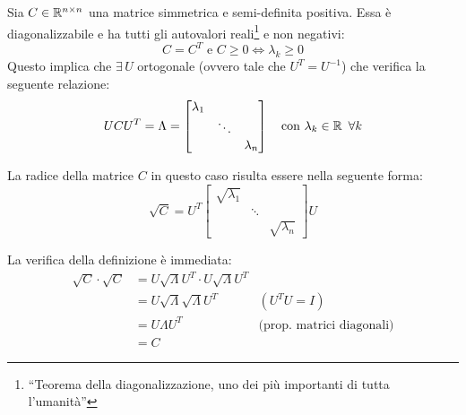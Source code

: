Sia $C \in \mathbb R^{n \times n}$ una matrice simmetrica e semi-definita positiva.
Essa è diagonalizzabile e ha tutti gli autovalori reali\footnote{``Teorema della diagonalizzazione, uno dei più importanti di tutta l'umanità''} e non negativi:
$$C=C^T \text{ e } C \ge 0 \iff \lambda_k \ge 0$$
Questo implica che $\exists \, U$ ortogonale (ovvero tale che $U^T=U^{-1}$) che verifica la seguente relazione:
$$ U C U^T = \Lambda =
\begin{bmatrix}
\lambda_1 \\
\ \ & \ddots & \ \ \\
\ \ & \ \ & \lambda_n
\end{bmatrix} \quad \text{con }\lambda_k \in \mathbb R \enspace \forall k$$

La radice della matrice $C$ in questo caso risulta essere nella seguente forma:
$$\sqrt{C} = U^T \begin{bmatrix}\sqrt{\lambda_1} & &  \\  & \ddots &  \\  &  & \sqrt{\lambda_n} \end{bmatrix} U $$

La verifica della definizione è immediata:
\begin{align*}
	\sqrt{C} \cdot \sqrt{C} &= U \sqrt{\Lambda} U^T \cdot U \sqrt{\Lambda} U^T &\\
	&= U \sqrt{\Lambda} \sqrt{\Lambda} U^T & (U^T U = I) \\
	&= U \Lambda U^T &\text{(prop. matrici diagonali)} \\
	&= C
\end{align*}

